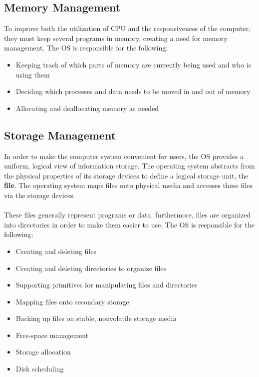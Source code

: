 \documentclass{article}
\begin{document}
\subsection{Memory Management}
To improve both the utilization of CPU and the responsiveness of the computer, they must keep several programs in memory, creating a need for memory management. The OS is responsible for the following:

\begin{itemize}
	\item Keeping track of which parts of memory are currently being used and who is using them
	\item Deciding which processes and data needs to be moved in and out of memory
	\item Allocating and deallocating memory as needed
\end{itemize}

\subsection{Storage Management}
In order to make the computer system convenient for users, the OS provides a uniform, logical view of information storage. The operating system abstracts from the physical properties of its storage devices to define a logical storage unit, the \textbf{file}. The operating system maps files onto physical media and accesses these files via the storage devices. \\ \\
These files generally represent programs or data. furthermore, files are organized into directories in order to make them easier to use, The OS is responsible for the following:

\begin{itemize}
	\item Creating and deleting files
	\item Creating and deleting directories to organize files
	\item Supporting primitives for manipulating files and directories
	\item Mapping files onto secondary storage
	\item Backing up files on stable, nonvolatile storage media
	\item Free-space management
	\item Storage allocation
	\item Disk scheduling
\end{itemize}
\end{document}
